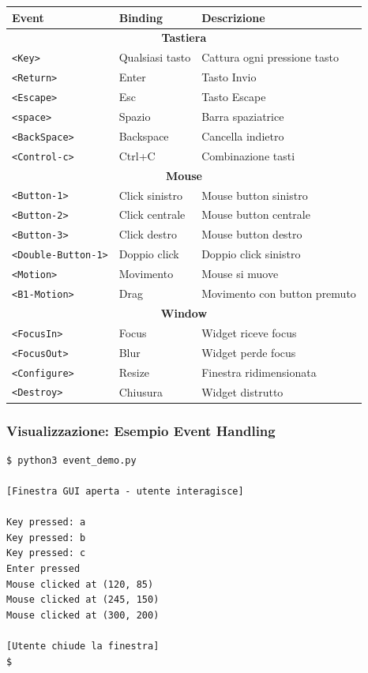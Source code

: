 \begin{center}
\begin{tabular}{|l|l|p{5cm}|}
\hline
\textbf{Event} & \textbf{Binding} & \textbf{Descrizione} \\
\hline
\multicolumn{3}{|c|}{\textbf{Tastiera}} \\
\hline
\verb|<Key>| & Qualsiasi tasto & Cattura ogni pressione tasto \\
\verb|<Return>| & Enter & Tasto Invio \\
\verb|<Escape>| & Esc & Tasto Escape \\
\verb|<space>| & Spazio & Barra spaziatrice \\
\verb|<BackSpace>| & Backspace & Cancella indietro \\
\verb|<Control-c>| & Ctrl+C & Combinazione tasti \\
\hline
\multicolumn{3}{|c|}{\textbf{Mouse}} \\
\hline
\verb|<Button-1>| & Click sinistro & Mouse button sinistro \\
\verb|<Button-2>| & Click centrale & Mouse button centrale \\
\verb|<Button-3>| & Click destro & Mouse button destro \\
\verb|<Double-Button-1>| & Doppio click & Doppio click sinistro \\
\verb|<Motion>| & Movimento & Mouse si muove \\
\verb|<B1-Motion>| & Drag & Movimento con button premuto \\
\hline
\multicolumn{3}{|c|}{\textbf{Window}} \\
\hline
\verb|<FocusIn>| & Focus & Widget riceve focus \\
\verb|<FocusOut>| & Blur & Widget perde focus \\
\verb|<Configure>| & Resize & Finestra ridimensionata \\
\verb|<Destroy>| & Chiusura & Widget distrutto \\
\hline
\end{tabular}
\end{center}

\subsubsection{Visualizzazione: Esempio Event Handling}

\begin{tcolorbox}[title=Output Terminale - Event Handling]
\begin{verbatim}
$ python3 event_demo.py

[Finestra GUI aperta - utente interagisce]

Key pressed: a
Key pressed: b
Key pressed: c
Enter pressed
Mouse clicked at (120, 85)
Mouse clicked at (245, 150)
Mouse clicked at (300, 200)

[Utente chiude la finestra]
$
\end{verbatim}
\end{tcolorbox}

